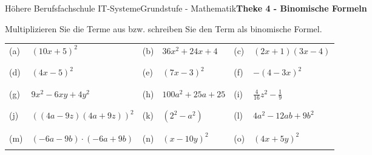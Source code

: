 \documentclass[oneside,openany,headings=optiontotoc,11pt,numbers=noenddot]{scrreprt}
\begin{document}
	\begin{worksheet}{Höhere Berufsfachschule IT-Systeme}{Grundstufe - Mathematik}{\textbf{Theke 4 - Binomische Formeln}}
		\begin{framed}
			\noindent
			Multiplizieren Sie die Terme aus bzw. schreiben Sie den Term als binomische Formel.\\
			\begin{tabularx}{\textwidth}{lXlXlX}
				\\
				(a) & \((10x+5)^2\) & (b) & \(36x^2+24x+4\) & (c) & \((2x+1)(3x-4)\)\\
				\\
				\hline
				\\
				(d) & \((4x-5)^2\) & (e) & \((7x-3)^2\) & (f) & \(-(4-3x)^2\)\\
				\\
				\hline
				\\
				(g) & \(9x^2 - 6xy +4y^2\) & (h) & \(100a^2+ 25a +25\) & (i) & \(\frac{4}{16}z^2 - \frac{1}{9}\)\\
				\\
				\hline
				\\
				(j) & \(((4a-9z)(4a+9z))^2\) & (k) & \((2^2 - a^2)\) & (l) & \(4a^2-12ab+9b^2\)\\
				\\
				\hline
				\\
				(m) & \((-6a-9b)\cdot(-6a+9b)\) & (n) & \((x-10y)^2\) & (o) & \((4x+5y)^2\)\\
				\\
				\hline
			\end{tabularx}
		\end{framed}
	\end{worksheet}
\end{document}
